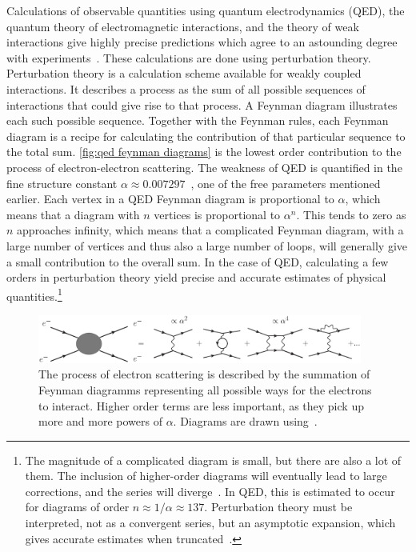 Calculations of observable quantities using quantum electrodynamics (QED), the quantum theory of electromagnetic interactions, and the theory of weak interactions give highly precise predictions which agree to an astounding degree with experiments~\cite{Schwartz:QFT}.
These calculations are done using perturbation theory.
Perturbation theory is a calculation scheme available for weakly coupled interactions.
It describes a process as the sum of all possible sequences of interactions that could give rise to that process.
A Feynman diagram illustrates each such possible sequence.
Together with the Feynman rules, each Feynman diagram is a recipe for calculating the contribution of that particular sequence to the total sum.
\autoref{fig:qed feynman diagrams} is the lowest order contribution to the process of electron-electron scattering.
The weakness of QED is quantified in the fine structure constant $\alpha \approx 0.00 7297$~\cite{PDG}, one of the free parameters mentioned earlier.
Each vertex in a QED Feynman diagram is proportional to $\alpha$, which means that a diagram with $n$ vertices is proportional to $\alpha^n$.
This tends to zero as $n$ approaches infinity, which means that a complicated Feynman diagram, with a large number of vertices and thus also a large number of loops, will generally give a small contribution to the overall sum.
In the case of QED, calculating a few orders in perturbation theory yield precise and accurate estimates of physical quantities.\footnote{The magnitude of a complicated diagram is small, but there are also a lot of them. The inclusion of higher-order diagrams will eventually lead to large corrections, and the series will diverge~\cite{dyson:divergence_of_perturbation}. In QED, this is estimated to occur for diagrams of order $n \approx 1 / \alpha \approx 137$. Perturbation theory must be interpreted, not as a convergent series, but an asymptotic expansion, which gives accurate estimates when truncated~\cite{flory:how_i_learn_to_stop}.}

\begin{figure}[h]
    \centering
    \includegraphics[width=0.95\textwidth]{figurer/feynman-diagram/sum_qed.eps}
    \caption{The process of electron scattering is described by the summation of Feynman diagramms representing all possible ways for the electrons to interact. Higher order terms are less important, as they pick up more and more powers of $\alpha$. Diagrams are drawn using~\cite{JaxoDraw}.}
    \label{fig:qed feynman diagrams}
\end{figure}

